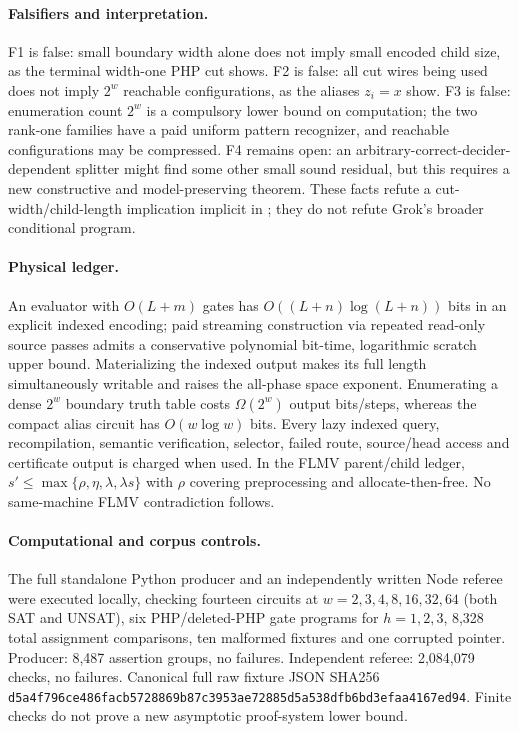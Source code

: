 \documentclass[11pt]{article}
\begin{document}
\paragraph{Falsifiers and interpretation.}
F1 is false: small boundary width alone does not imply small encoded child size, as the terminal width-one PHP cut shows. F2 is false: all cut wires being used does not imply $2^w$ reachable configurations, as the aliases $z_i=x$ show. F3 is false: enumeration count $2^w$ is a compulsory lower bound on computation; the two rank-one families have a paid uniform pattern recognizer, and reachable configurations may be compressed. F4 remains open: an arbitrary-correct-decider-dependent splitter might find some other small sound residual, but this requires a new constructive and model-preserving theorem. These facts refute a cut-width/child-length implication implicit in ; they do not refute Grok's broader conditional program.

\paragraph{Physical ledger.}
An evaluator with $O(L+m)$ gates has $O((L+n)\log(L+n))$ bits in an explicit indexed encoding; paid streaming construction via repeated read-only source passes admits a conservative polynomial bit-time, logarithmic scratch upper bound. Materializing the indexed output makes its full length simultaneously writable and raises the all-phase space exponent. Enumerating a dense $2^w$ boundary truth table costs $\Omega(2^w)$ output bits/steps, whereas the compact alias circuit has $O(w\log w)$ bits. Every lazy indexed query, recompilation, semantic verification, selector, failed route, source/head access and certificate output is charged when used. In the FLMV parent/child ledger, $s'\le\max\{\rho,\eta,\lambda,\lambda s\}$ with $\rho$ covering preprocessing and allocate-then-free. No same-machine FLMV contradiction follows.

\paragraph{Computational and corpus controls.}
The full standalone Python producer and an independently written Node referee were executed locally, checking fourteen circuits at $w=2,3,4,8,16,32,64$ (both SAT and UNSAT), six PHP/deleted-PHP gate programs for $h=1,2,3$, 8,328 total assignment comparisons, ten malformed fixtures and one corrupted pointer. Producer: 8,487 assertion groups, no failures. Independent referee: 2,084,079 checks, no failures. Canonical full raw fixture JSON SHA256 \texttt{d5a4f796ce486facb5728869b87c3953ae72885d5a538dfb6bd3efaa4167ed94}. Finite checks do not prove a new asymptotic proof-system lower bound.
\end{document}
